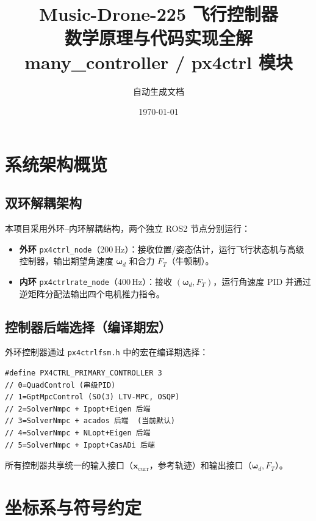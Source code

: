\documentclass[UTF8, a4paper, 11pt]{ctexart}
\title{\textbf{Music-Drone-225 飞行控制器\\数学原理与代码实现全解}\\[0.5em]
       \large many\_controller / px4ctrl 模块}
\author{自动生成文档}
\date{\today}
\newcommand{\bx}{\mathbf{x}}
\newcommand{\bw}{\boldsymbol{\omega}}
\begin{document}
\maketitle
\tableofcontents
\newpage

\section{系统架构概览}

\subsection{双环解耦架构}

本项目采用外环–内环解耦结构，两个独立 ROS2 节点分别运行：

\begin{itemize}
  \item \textbf{外环} \texttt{px4ctrl\_node}（200\,Hz）：接收位置/姿态估计，运行飞行状态机与高级控制器，输出期望角速度 $\bw_d$ 和合力 $F_T$（牛顿制）。
  \item \textbf{内环} \texttt{px4ctrlrate\_node}（400\,Hz）：接收 $(\bw_d, F_T)$，运行角速度 PID 并通过逆矩阵分配法输出四个电机推力指令。
\end{itemize}

\subsection{控制器后端选择（编译期宏）}

外环控制器通过 \texttt{px4ctrlfsm.h} 中的宏在编译期选择：

\begin{lstlisting}
#define PX4CTRL_PRIMARY_CONTROLLER 3
// 0=QuadControl (串级PID)
// 1=GptMpcControl (SO(3) LTV-MPC, OSQP)
// 2=SolverNmpc + Ipopt+Eigen 后端
// 3=SolverNmpc + acados 后端  (当前默认)
// 4=SolverNmpc + NLopt+Eigen 后端
// 5=SolverNmpc + Ipopt+CasADi 后端
\end{lstlisting}

所有控制器共享统一的输入接口（$\bx_{\text{curr}}$，参考轨迹）和输出接口（$\bw_d, F_T$）。

\section{坐标系与符号约定}
\end{document}
